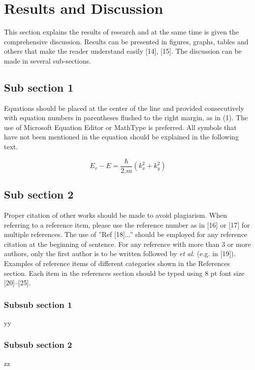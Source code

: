\documentclass{iaesarticle}
\begin{document}
\section{Results and Discussion}
\label{}
This section explains the results of research and at the same time is given the comprehensive discussion. Results can be presented in figures, graphs, tables and others that make the reader understand easily [14], [15]. The discussion can be made in several sub-sections.

\subsection{Sub section 1}
Equations should be placed at the center of the line and provided consecutively with equation numbers in parentheses flushed to the right margin, as in (1). The use of Microsoft Equation Editor or MathType is preferred. All symbols that have not been mentioned in the equation should be explained in the following text.

\begin{equation}
E_v - E = \frac{\hbar}{2.m}(k_x^2 + k_y^2)
\end{equation}


\subsection{Sub section 2}
Proper citation of other works should be made to avoid plagiarism. When referring to a reference item, please use the reference number as in [16] or [17] for multiple references. The use of ”Ref [18]...” should be employed for any reference citation at the beginning of sentence. For any reference with more than 3 or more authors, only the first author is to be written followed by \emph{et al.} (e.g. in [19]). Examples of reference items of different categories shown in the References section. Each item in the references section should be typed using 8 pt font size [20]–[25].

\subsubsection {Subsub section 1}
yy

\subsubsection {Subsub section 2}
zz
\end{document}
